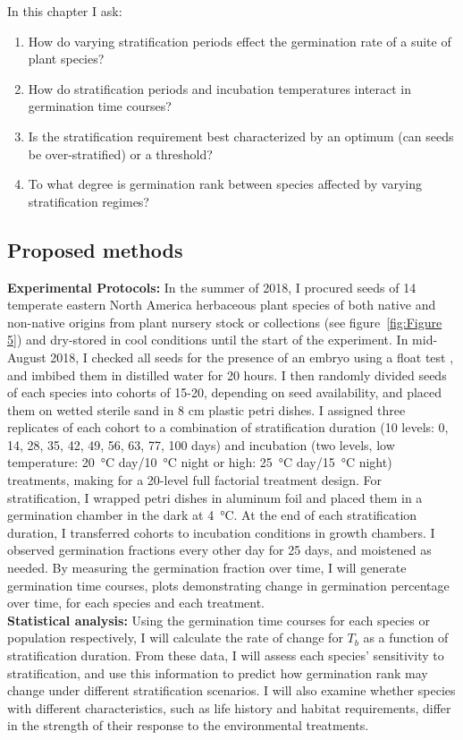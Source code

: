 \documentclass[12pt]{article}\usepackage[]{graphicx}\usepackage[]{color}
\begin{document}
\indent In this chapter I ask:
\begin{enumerate}
\item How do varying stratification periods effect the germination rate of a suite of plant species? 
\item How do stratification periods and incubation temperatures interact in germination time courses?
\item Is the stratification requirement best characterized by an optimum (can seeds be over-stratified) or a threshold?
\item To what degree is germination rank between species affected by varying stratification regimes?
\end{enumerate}
\subsection*{Proposed methods}
\indent\indent\textbf{Experimental Protocols:} In the summer of 2018, I procured seeds of 14 temperate eastern North America herbaceous plant species of both native and non-native origins from plant nursery stock or collections (see figure~\ref{fig:Figure 5}) and dry-stored in cool conditions until the start of the experiment. In mid-August 2018, I checked all seeds for the presence of an embryo using a float test \citep{Baskin2014}, and imbibed them in distilled water for 20 hours. I then randomly divided seeds of each species into cohorts of 15-20, depending on seed availability, and placed them on wetted sterile sand in 8 cm plastic petri dishes. I assigned three replicates of each cohort to a combination of stratification duration (10 levels: 0, 14, 28, 35, 42, 49, 56, 63, 77, 100 days) and incubation (two levels, low temperature: \SI{20}{\degreeCelsius} day/\SI{10}{\degreeCelsius} night or high: \SI{25}{\degreeCelsius} day/\SI{15}{\degreeCelsius} night) treatments, making for a 20-level full factorial treatment design. For stratification, I wrapped petri dishes in aluminum foil and placed them in a germination chamber in the dark at \SI{4}{\degreeCelsius}. At the end of each stratification duration, I transferred cohorts to incubation conditions in growth chambers. I observed germination fractions every other day for 25 days, and moistened as needed. By measuring the germination fraction over time, I will generate germination time courses, plots demonstrating change in germination percentage over time, for each species and each treatment.\\
\indent\textbf{Statistical analysis:} Using the germination time courses for each species or population respectively, I will calculate the rate of change for $T_b$ as a function of stratification duration. From these data, I will assess each species' sensitivity to stratification, and use this information to predict how germination rank may change under different stratification scenarios. I will also examine whether species with different characteristics, such as life history and habitat requirements, differ in the strength of their response to the environmental treatments.\\
\end{document}
